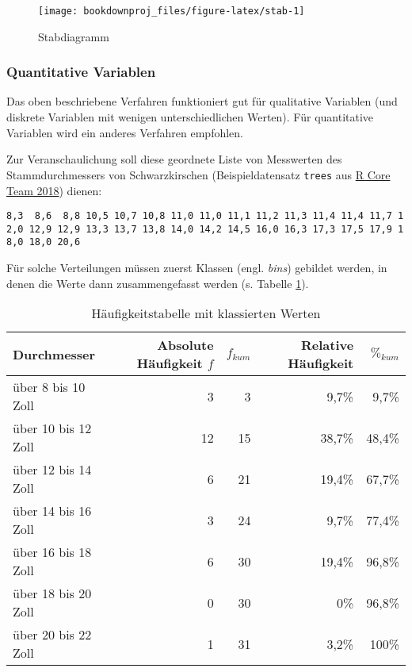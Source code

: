 \documentclass[
  ngerman,
]{article}
\begin{document}
\begin{figure}[h]

{\centering \texttt{[image: bookdownproj\_files/figure-latex/stab-1]} 

}

\caption{Stabdiagramm}\label{fig:stab}
\end{figure}

\hypertarget{quantitative-variablen-1}{%
\subsubsection{Quantitative Variablen}\label{quantitative-variablen-1}}

Das oben beschriebene Verfahren funktioniert gut für qualitative Variablen (und diskrete Variablen mit wenigen unterschiedlichen Werten). Für quantitative Variablen wird ein anderes Verfahren empfohlen.

Zur Veranschaulichung soll diese geordnete Liste von Messwerten des Stammdurchmessers von Schwarzkirschen (Beispieldatensatz \texttt{trees} aus \protect\hyperlink{ref-r}{R Core Team 2018}) dienen:

\texttt{8,3\ \ 8,6\ \ 8,8\ 10,5\ 10,7\ 10,8\ 11,0\ 11,0\ 11,1\ 11,2\ 11,3\ 11,4\ 11,4\ 11,7\ 12,0\ 12,9\ 12,9\ 13,3\ 13,7\ 13,8\ 14,0\ 14,2\ 14,5\ 16,0\ 16,3\ 17,3\ 17,5\ 17,9\ 18,0\ 18,0\ 20,6}

Für solche Verteilungen müssen zuerst Klassen (engl. \emph{bins}) gebildet werden, in denen die Werte dann zusammengefasst werden (s. Tabelle \ref{tab:haeufklass}).

\begin{table}

\caption{\label{tab:haeufklass}Häufigkeitstabelle mit klassierten Werten}
\centering
\begin{tabular}[t]{lrrrr}
\toprule
Durchmesser & Absolute Häufigkeit $f$ & $f_{kum}$ & Relative Häufigkeit & $\%_{kum}$\\
\midrule
über 8 bis 10 Zoll & 3 & 3 & 9,7\% & 9,7\%\\
über 10 bis 12 Zoll & 12 & 15 & 38,7\% & 48,4\%\\
über 12 bis 14 Zoll & 6 & 21 & 19,4\% & 67,7\%\\
über 14 bis 16 Zoll & 3 & 24 & 9,7\% & 77,4\%\\
über 16 bis 18 Zoll & 6 & 30 & 19,4\% & 96,8\%\\
über 18 bis 20 Zoll & 0 & 30 & 0\% & 96,8\%\\
über 20 bis 22 Zoll & 1 & 31 & 3,2\% & 100\%\\
\bottomrule
\end{tabular}
\end{table}
\end{document}
